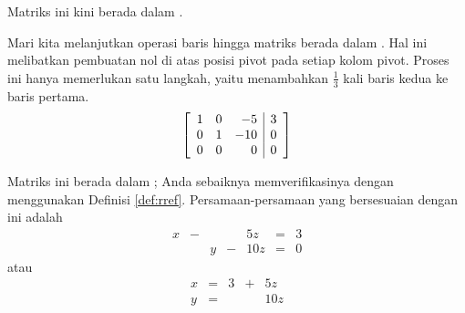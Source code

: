 \begin{solution}
Matriks ini kini berada dalam \ef.

Mari kita melanjutkan operasi baris hingga matriks berada dalam \rref.
Hal ini melibatkan pembuatan nol di atas posisi pivot pada setiap kolom pivot.
Proses ini hanya memerlukan satu langkah, yaitu menambahkan $ \frac{1}{3}$ kali baris kedua ke baris pertama.
\begin{equation*}
\left[
\begin{array}{rrr|r}
1 & 0 & -5 & 3 \\
0 & 1 & -10 & 0 \\
0 & 0 & 0 & 0
\end{array}
\right] 
\end{equation*}


Matriks ini berada dalam \rref; Anda sebaiknya memverifikasinya dengan menggunakan Definisi \ref{def:rref}.
 Persamaan-persamaan yang bersesuaian dengan \rref \;ini adalah
\[
\begin{array}{cccccccc}
x &-& &&5z&=&3 \\
&&y &-& 10z &=& 0 
\end{array}
\]
atau
\[
\begin{array}{ccccccc}
x&=&3&+&5z \\
y &=& &&10z
\end{array}
\]


\end{solution}
